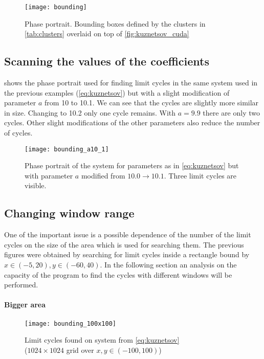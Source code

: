 \begin{figure}[H]
    \centering
    \texttt{[image: bounding]}
    \caption{Phase portrait. Bounding boxes defined by the clusters in \cref{tab:clusters} overlaid on top of \cref{fig:kuznetsov_cuda}
    }%
    \label{fig:bounding}
\end{figure}

\pagebreak
\subsection{Scanning the values of the coefficients}

 shows the phase portrait used for finding limit cycles in the same system used in the previous examples (\cref{eq:kuznetsov}) but with a slight modification of parameter $a$ from 10 to 10.1. We can see that the cycles are slightly more similar in size. Changing to 10.2 only one cycle remains. With $a = 9.9$ there are only two cycles. Other slight modifications of the other parameters also reduce the number of cycles.

\begin{figure}[H]
    \centering
    \texttt{[image: bounding\_a10\_1]}
    \caption{Phase portrait of the system for parameters as in \cref{eq:kuznetsov} but with parameter $a$ modified from $10.0 \to 10.1$. Three limit cycles are visible.
    }
    \label{fig:bounding_a10_1}
\end{figure}

\pagebreak
\subsection{Changing window range}%
\label{sub:window_range}

One of the important issue is a possible dependence of the number of the limit cycles on the size of the area which is used for searching them. The previous figures were obtained by searching for limit cycles inside a rectangle bound by $x \in (-5, 20), y \in (-60, 40)$. In the following section an analysis on the capacity of the program to find the cycles with different windows will be performed.

\paragraph{Bigger area}

\begin{figure}[H]
    \centering
    \texttt{[image: bounding\_100x100]}
    \caption{Limit cycles found on system from \cref{eq:kuznetsov} \\
        ($1024 \times 1024$ grid over $x, y \in (-100, 100)$)
    }%
    \label{fig:bounding_100x100}
\end{figure}

